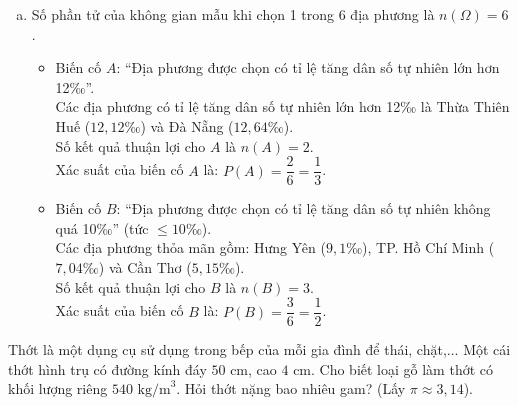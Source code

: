 \begin{bt}
{\begin{enumerate}[a)]
\begin{itemize}
        \item Cần Thơ: $13{,}5 - 8{,}35 = 5{,}15$‰.
    \end{itemize}
    So sánh các tỉ lệ trên, ta thấy $12{,}64$‰ là lớn nhất.\\
    Vậy Đà Nẵng là địa phương có tỉ lệ tăng dân số tự nhiên lớn nhất năm 2022 trong các địa phương đã cho.
    \item Số phần tử của không gian mẫu khi chọn 1 trong 6 địa phương là $n(\Omega) = 6$.
    \begin{itemize}
        \item Biến cố $A$: “Địa phương được chọn có tỉ lệ tăng dân số tự nhiên lớn hơn 12‰”.\\
        Các địa phương có tỉ lệ tăng dân số tự nhiên lớn hơn 12‰ là Thừa Thiên Huế ($12{,}12$‰) và Đà Nẵng ($12{,}64$‰).\\
        Số kết quả thuận lợi cho $A$ là $n(A) = 2$.\\
        Xác suất của biến cố $A$ là:
        $P(A) = \dfrac{2}{6} = \dfrac{1}{3}$.
        \item Biến cố $B$: “Địa phương được chọn có tỉ lệ tăng dân số tự nhiên không quá 10‰” (tức $\le 10$‰).\\
        Các địa phương thỏa mãn gồm: Hưng Yên ($9{,}1$‰), TP. Hồ Chí Minh ($7{,}04$‰) và Cần Thơ ($5{,}15$‰).\\
        Số kết quả thuận lợi cho $B$ là $n(B) = 3$.\\
        Xác suất của biến cố $B$ là:
        $P(B) = \dfrac{3}{6} = \dfrac{1}{2}$.
    \end{itemize}
\end{enumerate}
}
\end{bt}

\begin{bt}%
Thớt là một dụng cụ sử dụng trong bếp của mỗi gia đình để thái, chặt,... Một cái thớt hình trụ có đường kính đáy $50\text{ cm}$, cao $4\text{ cm}$. Cho biết loại gỗ làm thớt có khối lượng riêng $540\text{ kg/m}^3$. Hỏi thớt nặng bao nhiêu gam? (Lấy $\pi \approx 3{,}14$).
\end{bt}

